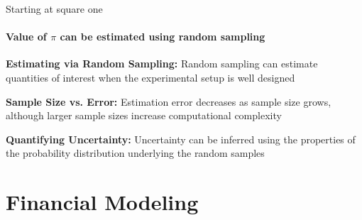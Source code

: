 \documentclass{beamer}
\begin{document}
\begin{frame}[fragile]{Starting at square one}
  \framesubtitle{Value of $\pi$ can be estimated using random sampling}

  \textbf{Estimating via Random Sampling:} Random sampling can estimate quantities
  of interest when the experimental setup is well designed

  \vspace{0.5cm}

  \textbf{Sample Size vs. Error:} Estimation error decreases as sample size grows,
  although larger sample sizes increase computational complexity

  \vspace{0.5cm}

  \textbf{Quantifying Uncertainty:} Uncertainty can be inferred using
  the properties of the probability distribution underlying the random samples

  \vspace{0.5cm}
\end{frame}

\section{Financial Modeling}
\end{document}
